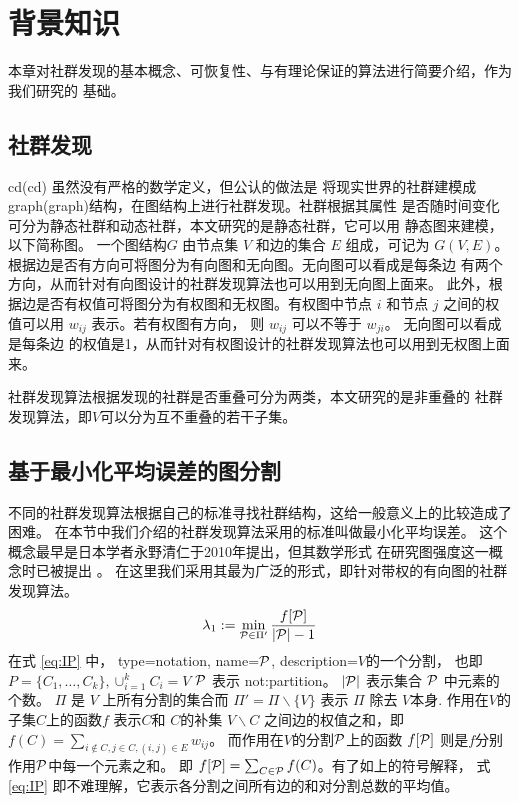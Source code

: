 
\chapter{背景知识}
本章对社群发现的基本概念、可恢复性、与有理论保证的算法进行简要介绍，作为我们研究的
基础。
\section{社群发现}\label{sec:community_detection}

\gls{cd}(\glsdesc{cd}) 虽然没有严格的数学定义，但公认的做法是
将现实世界的社群建模成\gls{graph}(\glsdesc{graph})结构，在图结构上进行社群发现。社群根据其属性
是否随时间变化可分为静态社群和动态社群，本文研究的是静态社群，它可以用
静态图来建模，以下简称图。
一个图结构$G$ 由节点集 $V$ 和边的集合 $E$ 组成，可记为 $G(V,E)$。
根据边是否有方向可将图分为有向图和无向图。无向图可以看成是每条边
有两个方向，从而针对有向图设计的社群发现算法也可以用到无向图上面来。
此外，根据边是否有权值可将图分为有权图和无权图。有权图中节点 $i$
和节点 $j$ 之间的权值可以用 $w_{ij}$ 表示。若有权图有方向，
则 $w_{ij}$ 可以不等于 $w_{ji}$。
无向图可以看成是每条边
的权值是1，从而针对有权图设计的社群发现算法也可以用到无权图上面来。

社群发现算法根据发现的社群是否重叠可分为两类，本文研究的是非重叠的
社群发现算法，即$V$可以分为互不重叠的若干子集。

\section{基于最小化平均误差的图分割}
不同的社群发现算法根据自己的标准寻找社群结构，这给一般意义上的比较造成了困难。
在本节中我们介绍的社群发现算法采用的标准叫做最小化平均误差。
这个概念最早是日本学者永野清仁于2010年提出\cite{mac}，但其数学形式
在研究图强度这一概念时已被提出 \cite{cunningham1985optimal}。
在这里我们采用其最为广泛的形式，即针对带权的有向图的社群发现算法。
\begin{equation}\label{eq:IP}
  \lambda_1 := \min_{\P \in \Pi'}\frac{ f[\P] }{  \abs{\P} - 1 } 
\end{equation}
在式 \eqref{eq:IP} 中，
{
  type=notation,
  name={$\P$},
  description={$V$的一个分割，
  也即  $P=\{C_1, \dots, C_k\},
  \cup_{i=1}^k C_i=V$}
}
$\P$ 表示 \glsdesc{not:partition}。
$\abs{\mathcal{P}}$ 表示集合 $\P$ 中元素的个数。
$\Pi$ 是 $V$ 上所有分割的集合而 $\Pi'=\Pi\backslash\{V\}$ 表示 $\Pi$
除去 $V$本身.
作用在$V$的子集$C$上的函数$f$
表示$C$和 $C$的补集 $V\backslash C$ 之间边的权值之和，即
$f(C)=\sum_{i \not\in C, j\in C, (i,j) \in E} w_{ij}$。
而作用在$V$的分割$\P$上的函数 $f[\P]$ 则是$f$分别作用$\P$中每一个元素之和。
即 $f[\P]=\sum_{C \in \P} f(C)$。有了如上的符号解释，
式 \eqref{eq:IP} 即不难理解，它表示各分割之间所有边的和对分割总数的平均值。

